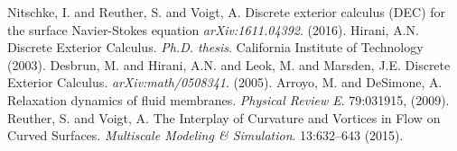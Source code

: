 \documentclass{xdms}
\begin{document}
\begin{thebibliography}{99}
\setlength{\parskip}{0pt}

 {Nitschke}, I. and {Reuther}, S. and {Voigt}, A.
Discrete exterior calculus (DEC) for the surface Navier-Stokes equation
{\it arXiv:1611.04392\/}. (2016).
Hirani, A.N.
  Discrete Exterior Calculus.
{\it Ph.D. thesis\/}. California Institute of Technology (2003).
 Desbrun, M. and Hirani, A.N. and Leok, M. and Marsden, J.E.
Discrete Exterior Calculus.
{\it arXiv:math/0508341\/}. (2005).
 Arroyo, M. and DeSimone, A.
Relaxation dynamics of fluid membranes.
{\it Physical Review E\/}. 79:031915, (2009).
 Reuther, S. and Voigt, A.
The Interplay of Curvature and Vortices in Flow on Curved Surfaces.
{\it Multiscale Modeling \& Simulation\/}. 13:632--643 (2015).

\end{thebibliography}
\end{document}
